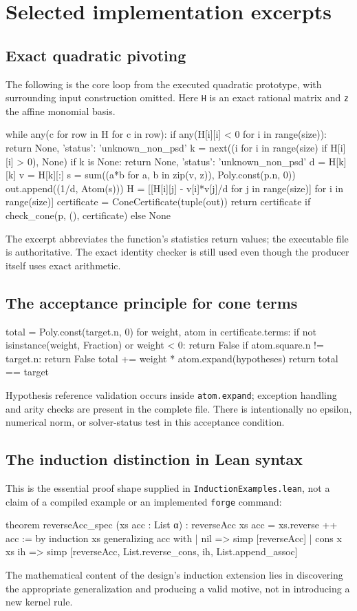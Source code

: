 \documentclass[11pt,letterpaper]{article}
\newcommand{\Lean}{\textsf{Lean}}
\theoremstyle{definition}
\theoremstyle{remark}
\begin{document}
\section{Selected implementation excerpts}
\subsection{Exact quadratic pivoting}
The following is the core loop from the executed quadratic prototype, with surrounding input construction omitted. Here \texttt{H} is an exact rational matrix and \texttt{z} the affine monomial basis.
\begin{code}
while any(c for row in H for c in row):
    if any(H[i][i] < 0 for i in range(size)):
        return None, {'status': 'unknown_non_psd'}
    k = next((i for i in range(size) if H[i][i] > 0), None)
    if k is None:
        return None, {'status': 'unknown_non_psd'}
    d = H[k][k]
    v = H[k][:]
    s = sum((a*b for a, b in zip(v, z)), Poly.const(p.n, 0))
    out.append((1/d, Atom(s)))
    H = [[H[i][j] - v[i]*v[j]/d
          for j in range(size)] for i in range(size)]
certificate = ConeCertificate(tuple(out))
return certificate if check_cone(p, (), certificate) else None
\end{code}
The excerpt abbreviates the function's statistics return values; the executable file is authoritative. The exact identity checker is still used even though the producer itself uses exact arithmetic.

\subsection{The acceptance principle for cone terms}
\begin{code}
total = Poly.const(target.n, 0)
for weight, atom in certificate.terms:
    if not isinstance(weight, Fraction) or weight < 0:
        return False
    if atom.square.n != target.n:
        return False
    total += weight * atom.expand(hypotheses)
return total == target
\end{code}
Hypothesis reference validation occurs inside \texttt{atom.expand}; exception handling and arity checks are present in the complete file. There is intentionally no epsilon, numerical norm, or solver-status test in this acceptance condition.

\subsection{The induction distinction in \Lean{} syntax}
This is the essential proof shape supplied in \texttt{InductionExamples.lean}, not a claim of a compiled example or an implemented \texttt{forge} command:
\begin{code}
theorem reverseAcc_spec (xs acc : List α) :
    reverseAcc xs acc = xs.reverse ++ acc := by
  induction xs generalizing acc with
  | nil => simp [reverseAcc]
  | cons x xs ih =>
      simp [reverseAcc, List.reverse_cons, ih, List.append_assoc]
\end{code}
The mathematical content of the design's induction extension lies in discovering the appropriate generalization and producing a valid motive, not in introducing a new kernel rule.
\end{document}

